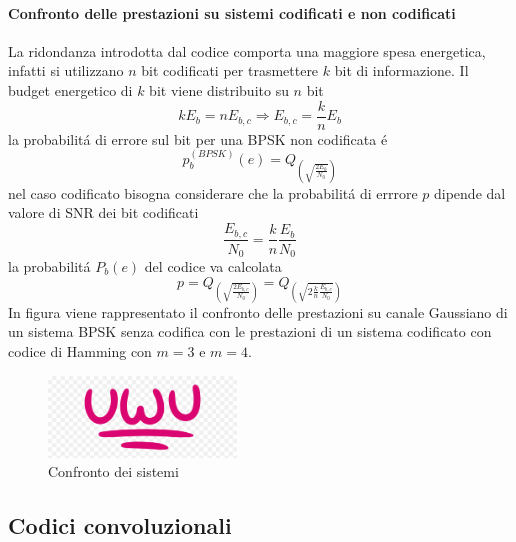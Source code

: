             \paragraph{Confronto delle prestazioni su sistemi codificati e non codificati}
                La ridondanza introdotta dal codice comporta una maggiore spesa energetica, infatti si utilizzano $n$ bit codificati 
                per trasmettere $k$ bit di informazione. Il budget energetico di $k$ bit viene distribuito su $n$ bit 
                \[
                    kE_b = nE_{b,c}\Rightarrow E_{b,c} = \frac{k}{n}E_b 
                \]
                la probabilitá di errore sul bit per una BPSK non codificata é 
                \[
                    p_b^{(BPSK)}(e) = Q_{\displaystyle\left(\sqrt{\frac{2E_b}{N_0}}\right)}  
                \]
                nel caso codificato bisogna considerare che la probabilitá di errrore $p$ dipende dal valore di SNR dei bit codificati
                \[
                    \frac{E_{b,c}}{N_0} = \frac{k}{n} \frac{E_b}{N_0}    
                \]
                la probabilitá $P_b(e)$ del codice va calcolata 
                \[
                    p = Q_{\displaystyle\left(\sqrt{\frac{2E_{b,c}}{N_0}}\right)} = Q_{\displaystyle\left(\sqrt{2\frac{k}{n}\frac{E_{b,c}}{N_0}}\right)} 
                \]
                In figura viene rappresentato il confronto delle prestazioni su canale Gaussiano di un sistema BPSK senza codifica
                con le prestazioni di un sistema codificato con codice di Hamming con $m=3$ e $m=4$.
                \begin{figure}[H]
                    \centering
                    \includegraphics[width = 5cm]{media/uwu.png}
                    \caption{Confronto dei sistemi}
                \end{figure}
        \subsection{Codici convoluzionali}
